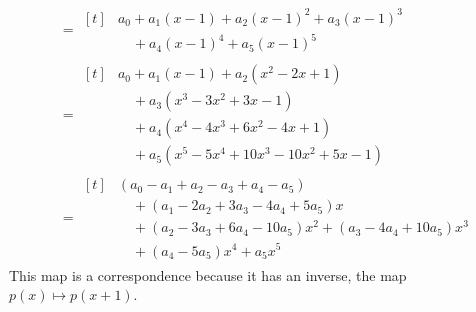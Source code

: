 \begin{exercises}
\begin{answer}
\begin{align*}
        &=\begin{aligned}[t]
             &a_0+a_1(x-1)+a_2(x-1)^2+a_3(x-1)^3 \\
             &\mbox{}\quad +a_4(x-1)^4+a_5(x-1)^5 
          \end{aligned}                                          \\
        &=\begin{aligned}[t]
             &a_0+a_1(x-1)+a_2(x^2-2x+1)         \\
             &\mbox{}\quad +a_3(x^3-3x^2+3x-1)   \\
             &\mbox{}\quad +a_4(x^4-4x^3+6x^2-4x+1) \\
             &\mbox{}\quad +a_5(x^5-5x^4+10x^3-10x^2+5x-1)
           \end{aligned}   \\
        &=\begin{aligned}[t]
           &(a_0-a_1+a_2-a_3+a_4-a_5)  \\
           &\mbox{}\quad +(a_1-2a_2+3a_3-4a_4+5a_5)x  \\
           &\mbox{}\quad +(a_2-3a_3+6a_4-10a_5)x^2
                        +(a_3-4a_4+10a_5)x^3         \\
           &\mbox{}\quad +(a_4-5a_5)x^4
                        +a_5x^5
          \end{aligned}
      \end{align*}
      This map is a correspondence because it has an inverse, the map
      \( p(x)\mapsto p(x+1) \).


\end{answer}
\end{exercises}
